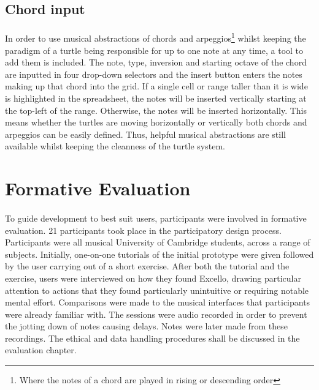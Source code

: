 \subsection{Chord input}

\paragraph{} In order to use musical abstractions of chords and arpeggios\footnote{Where the notes of a chord are played in rising or descending order} whilst keeping the paradigm of a turtle being responsible for up to one note at any time, a tool to add them is included. The note, type, inversion and starting octave of the chord are inputted in four drop-down selectors and the insert button enters the notes making up that chord into the grid. If a single cell or range taller than it is wide is highlighted in the spreadsheet, the notes will be inserted vertically starting at the top-left of the range. Otherwise, the notes will be inserted horizontally. This means whether the turtles are moving horizontally or vertically both chords and arpeggios can be easily defined. Thus, helpful musical abstractions are still available whilst keeping the cleanness of the turtle system.

\section{Formative Evaluation}

\paragraph{} To guide development to best suit users, participants were involved in formative evaluation. 21 participants took place in the participatory design process. Participants were all musical University of Cambridge students, across a range of subjects. Initially, one-on-one tutorials of the initial prototype were given followed by the user carrying out of a short exercise. After both the tutorial and the exercise, users were interviewed on how they found Excello, drawing particular attention to actions that they found particularly unintuitive or requiring notable mental effort. Comparisons were made to the musical interfaces that participants were already familiar with. The sessions were audio recorded in order to prevent the jotting down of notes causing delays. Notes were later made from these recordings. The ethical and data handling procedures shall be discussed in the evaluation chapter.

